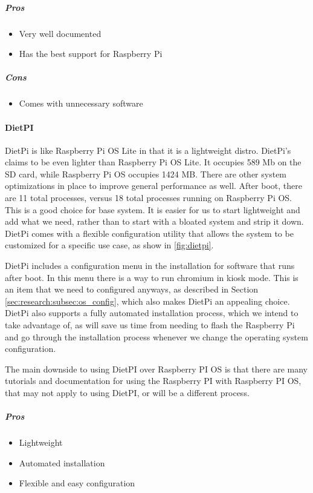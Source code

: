 \subparagraph{Pros}
\begin{itemize}
  \item Very well documented
  \item Has the best support for Raspberry Pi
\end{itemize}

\subparagraph{Cons}
\begin{itemize}
  \item Comes with unnecessary software
\end{itemize}

\paragraph{DietPI}

DietPi is like Raspberry Pi OS Lite in that it is a lightweight distro. DietPi's claims to
be even lighter than Raspberry Pi OS Lite. It occupies 589 Mb on the SD card, while
Raspberry Pi OS occupies 1424 MB. There are other system optimizations in place to improve
general performance as well. After boot, there are 11 total processes, versus 18 total
processes running on Raspberry Pi OS. This is a good choice for base system. It is easier
for us to start lightweight and add what we need, rather than to start with a bloated
system and strip it down. DietPi comes with a flexible configuration utility that allows
the system to be customized for a specific use case, as show in \autoref{fig:dietpi}.

DietPi includes a configuration menu in the installation for software that runs after
boot. In this menu there is a way to run chromium in kiosk mode. This is an item that we
need to configured anyways, as described in Section \ref{sec:research:subsec:os_config},
which also makes DietPi an appealing choice. DietPi also supports a fully automated
installation process, which we intend to take advantage of, as will save us time from
needing to flash the Raspberry Pi and go through the installation process whenever we
change the operating system configuration.

The main downside to using DietPI over Raspberry PI OS is that there are many tutorials
and documentation for using the Raspberry PI with Raspberry PI OS, that may not apply to
using DietPI, or will be a different process.

\subparagraph{Pros}
\begin{itemize}
  \item Lightweight
  \item Automated installation
  \item Flexible and easy configuration
\end{itemize}


